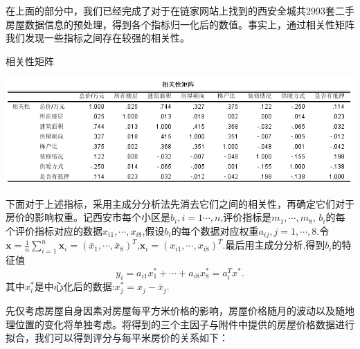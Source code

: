 \documentclass[withoutpreface,bwprint]{cumcmthesis} %
\begin{document}
在上面的部分中，我们已经完成了对于在链家网站\cite{RN2}上找到的西安全城共2993套二手房屋数据信息的预处理，得到各个指标归一化后的数值。事实上，通过相关性矩阵我们发现一些指标之间存在较强的相关性。
\begin{table}[H]
\centering
\caption{相关性矩阵}
    \includegraphics[scale=0.8]{相关性矩阵.png}    
    \label{fig:相关性矩阵}
\end{table}
下面对于上述指标，采用主成分分析法先消去它们之间的相关性，再确定它们对于房价的影响权重。记西安市每个小区是$b_{i},i=1\cdots,n$,评价指标是$m_1,\cdots,m_8$, $b_i$的每个评价指标对应的数据$x_{i1},\cdots,x_{i8}$,假设$b_i$的每个数据对应权重$a_{ij},j=1,\cdots,8$.令$\bm{x}=\frac{1}{n}\sum_{i=1}^n\bm{x}_i=(\bar{x}_1,\cdots,\bar{x}_8)^T$,$\bm{x}_i=(x_{i1},\cdots,x_{i8})^T$.最后用主成分分析,得到$b_i$的特征值
\begin{equation}
    y_i=a_{i1}x_{1}^\ast+\cdots+a_{i8}x_{8}^\ast=a_i^Tx^\ast.
\end{equation}
其中$x_i^\ast$是中心化后的数据:$x_j^\ast=x_j-\bar{x}_j$.

先仅考虑房屋自身因素对房屋每平方米价格的影响，房屋价格随月的波动以及随地理位置的变化将单独考虑。将得到的三个主因子与附件中提供的房屋价格数据进行拟合，我们可以得到评分与每平米房价的关系如下：
\end{document}
